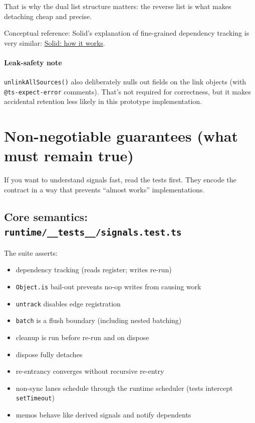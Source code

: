 That is why the dual list structure matters: the reverse list is what makes detaching cheap and precise.

Conceptual reference: Solid's explanation of fine-grained dependency tracking is very similar:
\href{https://www.solidjs.com/docs/latest#how-it-works}{Solid: how it works}.

\paragraph{Leak-safety note}

	\texttt{unlinkAllSources()} also deliberately nulls out fields on the link objects (with \texttt{@ts-expect-error} comments).
That’s not required for correctness, but it makes accidental retention less likely in this prototype implementation.

\section{Non-negotiable guarantees (what must remain true)}

If you want to understand signals fast, read the tests first.
They encode the contract in a way that prevents “almost works” implementations.

\subsection{Core semantics: \texttt{runtime/\_\_tests\_\_/signals.test.ts}}

The suite asserts:

\begin{itemize}
  \item dependency tracking (reads register; writes re-run)
  \item \texttt{Object.is} bail-out prevents no-op writes from causing work
  \item \texttt{untrack} disables edge registration
  \item \texttt{batch} is a flush boundary (including nested batching)
  \item cleanup is run before re-run and on dispose
  \item dispose fully detaches
  \item re-entrancy converges without recursive re-entry
  \item non-sync lanes schedule through the runtime scheduler (tests intercept \texttt{setTimeout})
  \item memos behave like derived signals and notify dependents
\end{itemize}

